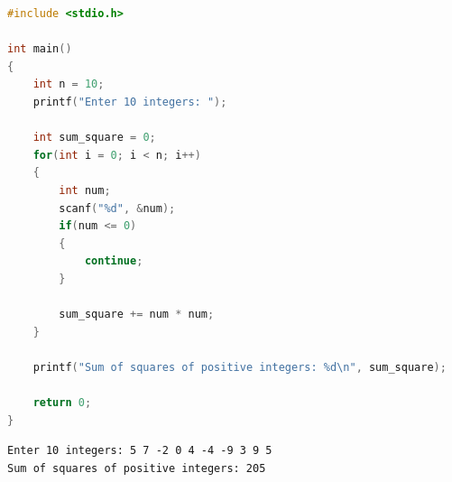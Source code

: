 
\begin{lstlisting}[language=C]
#include <stdio.h>

int main()
{
    int n = 10;
    printf("Enter 10 integers: ");

    int sum_square = 0;
    for(int i = 0; i < n; i++)
    {
        int num;
        scanf("%d", &num);
        if(num <= 0)
        {
            continue;
        }

        sum_square += num * num;
    }

    printf("Sum of squares of positive integers: %d\n", sum_square);

    return 0;
}
\end{lstlisting}

\begin{tcolorbox}
    \begin{verbatim}
Enter 10 integers: 5 7 -2 0 4 -4 -9 3 9 5
Sum of squares of positive integers: 205
\end{verbatim}
\end{tcolorbox}

\newpage